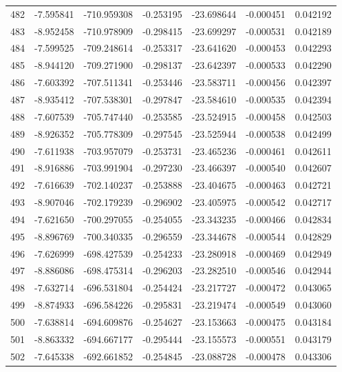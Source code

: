 \begin{tabular}{rrrrrrr}
 482 &  -7.595841 & -710.959308 & -0.253195 &  -23.698644 &   -0.000451 &  0.042192 \\
 483 &  -8.952458 & -710.978909 & -0.298415 &  -23.699297 &   -0.000531 &  0.042189 \\
 484 &  -7.599525 & -709.248614 & -0.253317 &  -23.641620 &   -0.000453 &  0.042293 \\
 485 &  -8.944120 & -709.271900 & -0.298137 &  -23.642397 &   -0.000533 &  0.042290 \\
 486 &  -7.603392 & -707.511341 & -0.253446 &  -23.583711 &   -0.000456 &  0.042397 \\
 487 &  -8.935412 & -707.538301 & -0.297847 &  -23.584610 &   -0.000535 &  0.042394 \\
 488 &  -7.607539 & -705.747440 & -0.253585 &  -23.524915 &   -0.000458 &  0.042503 \\
 489 &  -8.926352 & -705.778309 & -0.297545 &  -23.525944 &   -0.000538 &  0.042499 \\
 490 &  -7.611938 & -703.957079 & -0.253731 &  -23.465236 &   -0.000461 &  0.042611 \\
 491 &  -8.916886 & -703.991904 & -0.297230 &  -23.466397 &   -0.000540 &  0.042607 \\
 492 &  -7.616639 & -702.140237 & -0.253888 &  -23.404675 &   -0.000463 &  0.042721 \\
 493 &  -8.907046 & -702.179239 & -0.296902 &  -23.405975 &   -0.000542 &  0.042717 \\
 494 &  -7.621650 & -700.297055 & -0.254055 &  -23.343235 &   -0.000466 &  0.042834 \\
 495 &  -8.896769 & -700.340335 & -0.296559 &  -23.344678 &   -0.000544 &  0.042829 \\
 496 &  -7.626999 & -698.427539 & -0.254233 &  -23.280918 &   -0.000469 &  0.042949 \\
 497 &  -8.886086 & -698.475314 & -0.296203 &  -23.282510 &   -0.000546 &  0.042944 \\
 498 &  -7.632714 & -696.531804 & -0.254424 &  -23.217727 &   -0.000472 &  0.043065 \\
 499 &  -8.874933 & -696.584226 & -0.295831 &  -23.219474 &   -0.000549 &  0.043060 \\
 500 &  -7.638814 & -694.609876 & -0.254627 &  -23.153663 &   -0.000475 &  0.043184 \\
 501 &  -8.863332 & -694.667177 & -0.295444 &  -23.155573 &   -0.000551 &  0.043179 \\
 502 &  -7.645338 & -692.661852 & -0.254845 &  -23.088728 &   -0.000478 &  0.043306 \\

\end{tabular}
